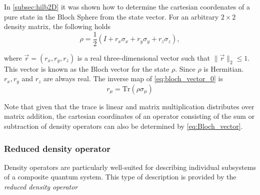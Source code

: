 In \autoref{subsec:hilb2D} it was shown how to determine the cartesian coordenates of a pure state in the Bloch Sphere from the state vector. For an arbitrary $2 \times 2$ density matrix, the following holds
\begin{equation} \label{eq:bloch_vector_0}
  \rho = \frac{1}{2}(I + r_{x}\sigma_{x} + r_{y}\sigma_{y} + r_{z}\sigma_{z}),
\end{equation} 

where $\vec{r} = (r_x, r_y, r_z)$ is a real three-dimensional vector such that $\| \vec{r} \|_2 \leq 1$. This vector is known as the Bloch vector for the state $\rho$. Since $\rho$ is Hermitian. $r_x, r_y$ and $r_z$ are always real.  The inverse map of \autoref{eq:bloch_vector_0} is
\begin{equation}
  \label{eq:Bloch_vector}
  r_{\mu} = \text{Tr}(\rho \sigma_{\mu})
  \end{equation}

  Note that given that the trace is linear and matrix multiplication distributes over matrix addition, the cartesian coordinates of an operator consisting of the sum or subtraction of density operators can also be determined by \autoref{eq:Bloch_vector}.

\subsubsection{Reduced density operator}

Density operators are particularly well-suited for describing individual subsystems of a composite quantum system. This type of description is provided by the \emph{reduced density operator}

